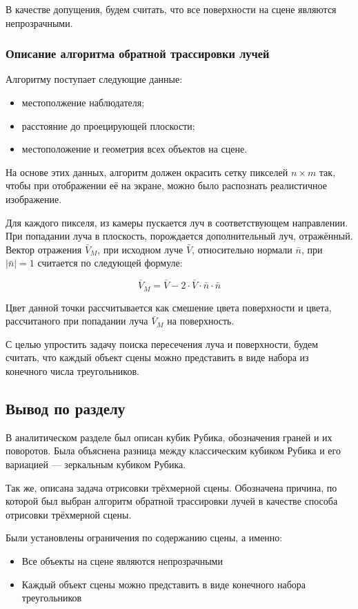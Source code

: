 В качестве допущения, будем считать, что все поверхности на сцене являются непрозрачными.

\subsubsection{Описание алгоритма обратной трассировки лучей}
Алгоритму поступает следующие данные:
\begin{itemize}
	\item местополжение наблюдателя;
	\item расстояние до проецирующей плоскости;
	\item местоположение и геометрия всех объектов на сцене.
\end{itemize}

На основе этих данных, алгоритм должен окрасить сетку пикселей $n\times m$ так, чтобы при отображении её на экране, можно было распознать реалистичное изображение.

Для каждого пикселя, из камеры пускается луч в соответствующем направлении. При попадании луча в плоскость, порождается дополнительный луч, отражённый. Вектор отражения $\bar V_M$, при исходном луче $\bar V$, относительно нормали $\bar n$, при $|\bar n| = 1$ считается по следующей формуле:

\begin{equation}
	\bar V_M = \bar V - 2\cdot\bar V \cdot\bar n\cdot\bar n
	\label{eq:bounce}
\end{equation}

Цвет данной точки рассчитывается как смешение цвета поверхности и цвета, рассчитаного при попадании луча $\bar V_M$ на поверхность.

С целью упростить задачу поиска пересечения луча и поверхности, будем считать, что каждый объект сцены можно представить в виде набора из конечного числа треугольников.

\subsection{Вывод по разделу}
В аналитическом разделе был описан кубик Рубика, обозначения граней и их поворотов. Была объяснена разница между классическим кубиком Рубика и его вариацией --- зеркальным кубиком Рубика.

Так же, описана задача отрисовки трёхмерной сцены. Обозначена причина, по которой был выбран алгоритм обратной трассировки лучей в качестве способа отрисовки трёхмерной сцены.

Были установлены ограничения по содержанию сцены, а именно:
\begin{itemize}
	\item Все объекты на сцене являются непрозрачными
	\item Каждый объект сцены можно представить в виде конечного набора треугольников
\end{itemize}

